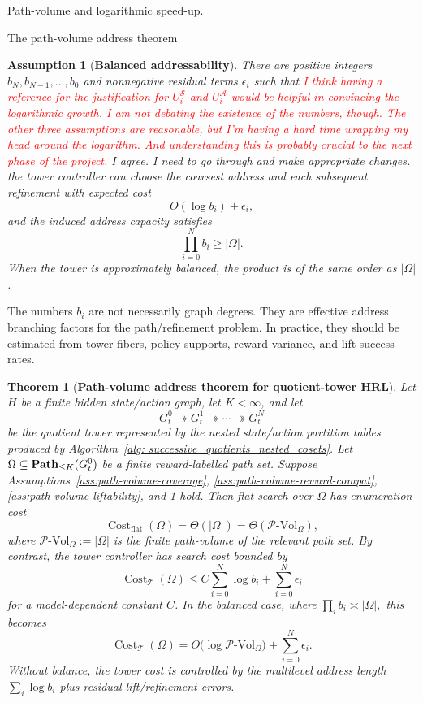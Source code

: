 \documentclass[11pt]{article}
\newtheorem{assumption}[subsubsection]{Assumption}
\newtheorem{theorem}[subsubsection]{Theorem}
\newcommand{\PVol}{\mathcal{P}\text{-}\mathrm{Vol}}
\newcommand{\cost}{\operatorname{Cost}}
\begin{document}
\begin{section}{Path-volume and logarithmic speed-up.}
\begin{subsection}{The path-volume address theorem}
\begin{assumption}[{\bf Balanced addressability}]\label{ass:path-volume-balanced}
\normalfont
There are positive integers
$
b_N,b_{N-1},\ldots,b_0
$
and nonnegative residual terms $\epsilon_i$ such that \textcolor{red}{I think having a reference for the justification for $U^{\mathcal{S}}_i$ and $U^{\mathcal{A}}_i$ would be helpful in convincing the logarithmic growth. I am not debating the existence of the numbers, though. The other three assumptions are reasonable, but I'm having a hard time wrapping my head around the logarithm. And understanding this is probably crucial to the next phase of the project.} {\color{blue} I agree. I need to go through and make appropriate changes.} the tower controller can choose the coarsest address and each subsequent refinement with expected cost
$$
O(\log b_i)+\epsilon_i,
$$
and the induced address capacity satisfies
$$
\prod_{i=0}^{N}b_i\ge |\Omega|.
$$
When the tower is approximately balanced, the product is of the same order as $|\Omega|$.
\end{assumption}

The numbers $b_i$ are not necessarily graph degrees. They are effective address branching factors for the path/refinement problem. In practice, they should be estimated from tower fibers, policy supports, reward variance, and lift success rates.

\begin{theorem}[{\bf Path-volume address theorem for quotient-tower HRL}]\label{thm:path-volume-address}
Let $H$ be a finite hidden state/action graph, let $K<\infty$, and let
$$
G_t^0 \twoheadrightarrow G_t^1 \twoheadrightarrow \cdots \twoheadrightarrow G_t^N
$$
be the quotient tower represented by the nested state/action partition tables produced by Algorithm~\ref{alg: successive_quotients_nested_cosets}. Let
$
\Omega\subseteq\bold{Path}_{\le K}(G_t^0)
$
be a finite reward-labelled path set. Suppose Assumptions~\ref{ass:path-volume-coverage}, \ref{ass:path-volume-reward-compat}, \ref{ass:path-volume-liftability}, and \ref{ass:path-volume-balanced} hold. Then flat search over $\Omega$ has enumeration cost
$$
\cost_{\mathrm{flat}}(\Omega)
=
\Theta(|\Omega|)
=
\Theta(\PVol_{\Omega}),
$$
where $\PVol_{\Omega}:=|\Omega|$ is the finite path-volume of the relevant path set. By contrast, the tower controller has search cost bounded by
$$
\cost_{\mathcal{T}}(\Omega)
\le
C\sum_{i=0}^{N}\log b_i+\sum_{i=0}^{N}\epsilon_i
$$
for a model-dependent constant $C$. In the balanced case, where
$
\prod_i b_i\asymp |\Omega|,
$
this becomes
$$
\cost_{\mathcal{T}}(\Omega)
=
O\bigl(\log \PVol_{\Omega}\bigr)
+
\sum_{i=0}^{N}\epsilon_i.
$$
Without balance, the tower cost is controlled by the multilevel address length $\sum_i\log b_i$ plus residual lift/refinement errors.
\end{theorem}


\end{subsection}
\end{section}
\end{document}
